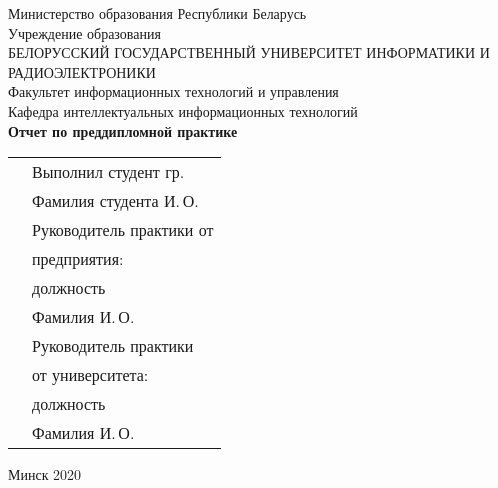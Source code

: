 \begin{titlepage}
    
    \begin{center}
        Министерство образования Республики Беларусь \\[0.4cm] 

        Учреждение образования \\

        \MakeUppercase{БЕЛОРУССКИЙ ГОСУДАРСТВЕННЫЙ УНИВЕРСИТЕТ ИНФОРМАТИКИ И РАДИОЭЛЕКТРОНИКИ} \\[0.4cm]

        Факультет информационных технологий и управления \\[0.4cm]

        Кафедра интеллектуальных информационных технологий \\[3.4cm] %

        {\large\bfseries{Отчет по преддипломной практике}} \\[2cm]

        \noindent
        \begin{tabular}{p{}p{}}
            & Выполнил студент гр.  \\
            & Фамилия студента И.\,О. \\[1cm]

            & Руководитель практики от \\
            & предприятия: \\
            & должность \\
            & Фамилия И.\,О. \\[1cm]

            & Руководитель практики \\
            & от университета: \\
            & должность \\
            & Фамилия И.\,О. \\
        \end{tabular}

        \vfill

        {\normalsize Минск 2020}
    \end{center}

\end{titlepage}
